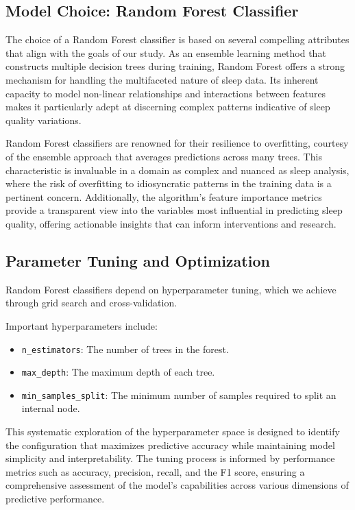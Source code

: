 \documentclass[10pt]{extarticle}
\begin{document}
\subsection{Model Choice: Random Forest Classifier}

The choice of a Random Forest classifier is based on several compelling attributes that align with the goals of our study. As an ensemble learning method that constructs multiple decision trees during training, Random Forest offers a strong mechanism for handling the multifaceted nature of sleep data. Its inherent capacity to model non-linear relationships and interactions between features makes it particularly adept at discerning complex patterns indicative of sleep quality variations.

Random Forest classifiers are renowned for their resilience to overfitting, courtesy of the ensemble approach that averages predictions across many trees. This characteristic is invaluable in a domain as complex and nuanced as sleep analysis, where the risk of overfitting to idiosyncratic patterns in the training data is a pertinent concern. Additionally, the algorithm's feature importance metrics provide a transparent view into the variables most influential in predicting sleep quality, offering actionable insights that can inform interventions and research.

\subsection{Parameter Tuning and Optimization}
Random Forest classifiers depend on hyperparameter tuning, which we achieve through grid search and cross-validation.

Important hyperparameters include:

\begin{itemize}
    \item \texttt{n\_estimators}: The number of trees in the forest.
    \item \texttt{max\_depth}: The maximum depth of each tree.
    \item \texttt{min\_samples\_split}: The minimum number of samples required to split an internal node.
\end{itemize}

This systematic exploration of the hyperparameter space is designed to identify the configuration that maximizes predictive accuracy while maintaining model simplicity and interpretability. The tuning process is informed by performance metrics such as accuracy, precision, recall, and the F1 score, ensuring a comprehensive assessment of the model's capabilities across various dimensions of predictive performance.
\end{document}
